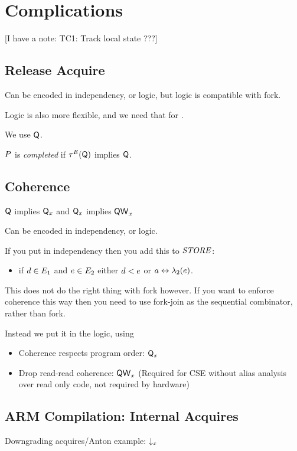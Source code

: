 \section{Complications}

[I have a note: TC1: Track local state ???]

\subsection{Release Acquire}

Can be encoded in independency, or logic, but logic is compatible with fork.

Logic is also more flexible, and we need that for \armeight.

We use $\Q$.

\begin{definition}
  $\aPS$ is \emph{completed} if $\aTr[\aEvs](\Q)$ implies $\Q$.
\end{definition}
\subsection{Coherence}

$\Q$ implies $\Qx{\aLoc}$
and
$\Qx{\aLoc}$ implies $\Qw{\aLoc}$

Can be encoded in independency, or logic.

If you put in independency then you add this to $\sSTORE{}{}$:
\begin{itemize}
\item if $\bEv\in\aEvs_1$ and $\aEv\in\aEvs_2$ either $\bEv<\SB0\aEv$ or $a\reorder\labeling_2(\aEv)$.
\end{itemize}
This does not do the right thing with fork however.  If you want to enforce
coherence this way then you need to use fork-join as the sequential
combinator, rather than fork.

Instead we put it in the logic, using 

\begin{itemize}
\item Coherence respects program order: $\Qx{\aLoc}$
\item Drop read-read coherence: $\Qw{\aLoc}$ (Required for CSE without
  alias analysis over read only code, not required by hardware)
\end{itemize}



\subsection{ARM Compilation: Internal Acquires}
Downgrading acquires/Anton example: $\Dx{\aLoc}$

